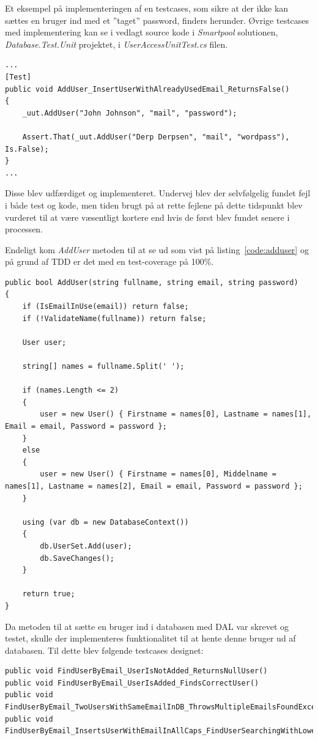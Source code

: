 Et eksempel på implementeringen af en testcases, som sikre at der ikke kan sættes en bruger ind med et ''taget'' password, finders herunder. Øvrige testcases med implementering kan se i vedlagt source kode i \textit{Smartpool} solutionen, \textit{Database.Test.Unit} projektet, i \textit{UserAccessUnitTest.cs} filen.

\begin{lstlisting}
...
[Test]
public void AddUser_InsertUserWithAlreadyUsedEmail_ReturnsFalse()
{
	_uut.AddUser("John Johnson", "mail", "password");
	
	Assert.That(_uut.AddUser("Derp Derpsen", "mail", "wordpass"), Is.False);
}
...
\end{lstlisting}

Disse blev udfærdiget og implementeret. Undervej blev der selvfølgelig fundet fejl i både test og kode, men tiden brugt på at rette fejlene på dette tidspunkt blev vurderet til at være væsentligt kortere end hvis de først blev fundet senere i processen. 

Endeligt kom \textit{AddUser} metoden til at se ud som vist på listing~\ref{code:adduser} og på grund af TDD er det med en test-coverage på 100\%.

\begin{lstlisting}[caption=\textit{AddUser} klassen,label=code:adduser]
public bool AddUser(string fullname, string email, string password)
{
	if (IsEmailInUse(email)) return false;
	if (!ValidateName(fullname)) return false;
	
	User user;
	
	string[] names = fullname.Split(' ');
	
	if (names.Length <= 2)
	{
		user = new User() { Firstname = names[0], Lastname = names[1], Email = email, Password = password };
	}
	else
	{
		user = new User() { Firstname = names[0], Middelname = names[1], Lastname = names[2], Email = email, Password = password };
	}
	
	using (var db = new DatabaseContext())
	{
		db.UserSet.Add(user);
		db.SaveChanges();
	}
	
	return true;
}
\end{lstlisting}

Da metoden til at sætte en bruger ind i databasen med DAL var skrevet og testet, skulle der implementeres funktionalitet til at hente denne bruger ud af databasen. Til dette blev følgende testcases designet:

\begin{lstlisting}[caption=Testcases til \textit{FindUserByEmail} metoden.,label=code:finduserbyemailtestcases]
public void FindUserByEmail_UserIsNotAdded_ReturnsNullUser()
public void FindUserByEmail_UserIsAdded_FindsCorrectUser()
public void FindUserByEmail_TwoUsersWithSameEmailInDB_ThrowsMultipleEmailsFoundException()
public void FindUserByEmail_InsertsUserWithEmailInAllCaps_FindUserSearchingWithLowerCaps()
\end{lstlisting}

